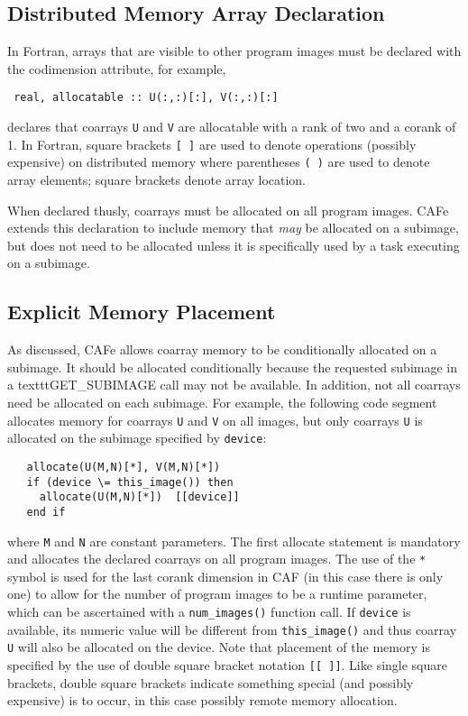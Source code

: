 \subsection{Distributed Memory Array Declaration}

In Fortran, arrays that are visible to other program images must be declared with the
codimension attribute, for example,
\begin{verbatim}
 real, allocatable :: U(:,:)[:], V(:,:)[:]
\end{verbatim}
declares that coarrays \texttt{U} and \texttt{V} are allocatable with a rank of two
and a corank of 1.  In Fortran, square brackets \texttt{[ ]} are used to denote operations
(possibly expensive) on distributed memory where parentheses \texttt{( )} are used to
denote array elements; square brackets denote array location.

When declared thusly, coarrays must be allocated on all program images.  CAFe extends this
declaration to include memory that \emph{may} be allocated on a subimage, but does not
need to be allocated unless it is specifically used by a task executing on a subimage.


\subsection{Explicit Memory Placement}

As discussed, CAFe allows coarray memory to be conditionally allocated on a subimage.
It should be allocated conditionally because the requested subimage in a texttt{GET\_SUBIMAGE}
call may not be available.  In addition, not all coarrays need be allocated on each
subimage.  For example, the following code segment allocates memory for coarrays
\texttt{U} and \texttt{V} on all images, but only coarrays \texttt{U} is allocated on
the subimage specified by \texttt{device}:
\begin{verbatim}
   allocate(U(M,N)[*], V(M,N)[*])
   if (device \= this_image()) then
     allocate(U(M,N)[*])  [[device]]
   end if
\end{verbatim}
where \texttt{M} and \texttt{N} are constant parameters.  The first allocate statement is
mandatory and allocates the declared coarrays on all program images.  The use of the
\texttt{*} symbol is used for the last corank dimension in CAF (in this case there is only
one) to allow for the number of program images to be a runtime parameter, which can be
ascertained with a \texttt{num\_images()} function call.  If \texttt{device} is
available, its numeric value will be different from \texttt{this\_image()} and thus
coarray \texttt{U} will also be allocated on the device.  Note that placement of the
memory is specified by the use of double square bracket notation \texttt{[[ ]]}.  Like
single square brackets, double square brackets indicate something special (and possibly
expensive) is to occur, in this case possibly remote memory allocation.


